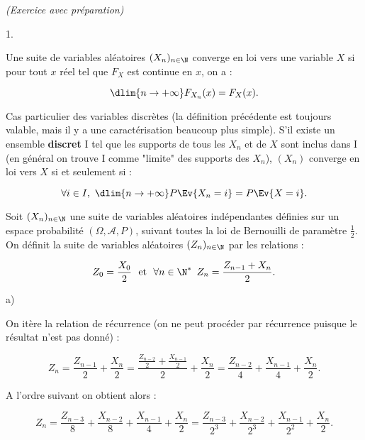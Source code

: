 \documentclass[11pt]{article}%
\begin{document}
 \begin{exercice}{\it (Exercice avec préparation)}~
 \begin{noliste}{1.}
 \setlength{\itemsep}{4mm}
 \item Une suite de variables aléatoires $(X_{n})_{ n \in \N }$
converge en loi vers une variable $X$ si pour tout $x$ réel tel que
$F_{X}$ est continue en $x$, on a : 
 
\[
 \dlim{ n \rightarrow + \infty } F_{ X_{n} } (x) = F_{X} ( x). 
\]

 Cas particulier des variables discrètes (la définition précédente est
toujours valable, mais il y a une caractérisation beaucoup plus
simple). S'il existe un ensemble \textbf{discret} I tel que les
supports de tous les $X_{n}$ et de $X$ sont inclus dans I (en général
on trouve I comme "limite" des supports des $X_{n}$), $(X_{n})$
converge en loi vers $X$ si et seulement si : 
 
\[
 \forall i \in I, \ \dlim{ n \rightarrow + \infty } P \Ev{ X_{n} = i }
= P \Ev{ X = i }. 
\]

 Soit $(X_{n})_{ n \in \N }$ une suite de variables aléatoires
indépendantes définies sur un espace probabilité $(\Omega, \mathcal{A},
P)$, suivant toutes la loi de Bernouilli de paramètre $\frac{1}{2}$. \\

 On définit la suite de variables aléatoires $(Z_{n})_{ n \in \N }$ par
les relations : 
 
\[
 Z_{0} = \frac{ X_{0} }{ 2 } \ \text{ et } \ \forall n \in \N^* \, \
Z_{n} = \frac{ Z_{n-1} + X_{n} }{ 2 }. 
\]

 \item \begin{noliste}{a)}
 \setlength{\itemsep}{2mm}

 \item On itère la relation de récurrence (on ne peut procéder par
récurrence puisque le résultat n'est pas donné) : 
 
\[
 Z_{n} = \frac{ Z_{n-1} }{ 2 } + \frac{ X_{n} }{ 2 } = \frac{ \frac{
Z_{n-2} }{ 2 } + \frac{ X_{n-1} }{ 2 } }{ 2 } + \frac{ X_{n} }{ 2 } =
\frac{ Z_{n-2} }{ 4 } + \frac{ X_{n-1} }{ 4 } + \frac{ X_{n} }{ 2 }. 
\]

 A l'ordre suivant on obtient alors : 
 
\[
 Z_{n} = \frac{ Z_{n-3} }{ 8 } + \frac{ X_{n-2} }{ 8 } + \frac{ X_{n-1}
}{ 4 } + \frac{ X_{n} }{ 2 } = \frac{ Z_{n-3} }{ 2^{3} } + \frac{
X_{n-2} }{ 2^{3} } + \frac{ X_{n-1} }{ 2^{2} } + \frac{ X_{n} }{ 2 }. 
\]


\end{noliste}
\end{noliste}
\end{exercice}
\end{document}
